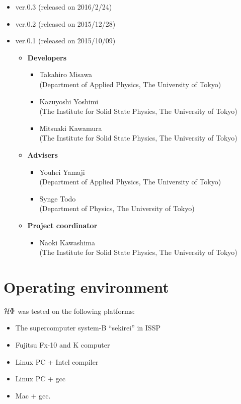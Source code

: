 \begin{itemize}
\item{ver.0.3 (released on 2016/2/24)}
\item{ver.0.2 (released on 2015/12/28)}
\item{ver.0.1 (released on 2015/10/09)}
\begin{itemize}
	\item{\bf Developers}
	\begin{itemize}
	\item{Takahiro Misawa \\(Department of Applied Physics, The University of Tokyo)}
	\item{Kazuyoshi Yoshimi\\ (The Institute for Solid State Physics, The University of Tokyo)}
	\item{Mitsuaki Kawamura\\ (The Institute for Solid State Physics, The University of Tokyo)}
	\end{itemize}
	\item{\bf Advisers}
	\begin{itemize}
	\item{Youhei Yamaji\\ (Department of Applied Physics, The University of Tokyo)}
	\item{Synge Todo\\ (Department of Physics, The University of Tokyo)}
	\end{itemize}
	\item{\bf Project coordinator}
	\begin{itemize}
	\item{Naoki Kawashima\\ (The Institute for Solid State Physics, The University of Tokyo)}
	\end{itemize}
\end{itemize}
\end{itemize}

\section{Operating environment}
 $\mathcal{H} \Phi$ was tested on the following platforms:

\begin{itemize}
\item The supercomputer system-B ``sekirei'' in ISSP
\item Fujitsu Fx-10 and K computer
\item Linux PC + Intel compiler
\item Linux PC + gcc
\item Mac + gcc.
\end{itemize}
